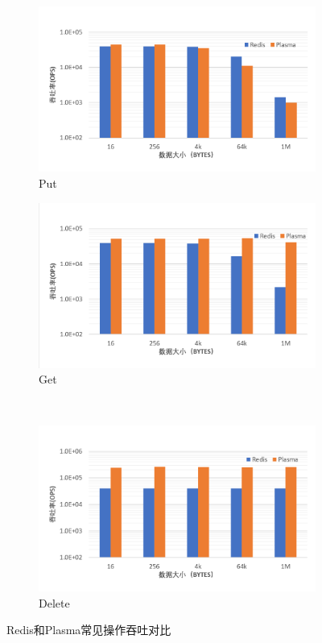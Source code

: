 \begin{figure}[h]
    \begin{subfigure}{0.49\textwidth}
        \includegraphics[width=\textwidth]{image/chap02/set.png}
        \caption{Put}
    \end{subfigure}
    \begin{subfigure}{0.49\textwidth}
        \includegraphics[width=\textwidth]{image/chap02/get.png}
        \caption{Get}
    \end{subfigure}
    \\
    \centering
    \begin{subfigure}{0.49\textwidth}
        \includegraphics[width=\textwidth]{image/chap02/del.png}
        \caption{Delete}
    \end{subfigure}
    \caption{Redis和Plasma常见操作吞吐对比}
    \label{fig:local_bench}
\end{figure}

